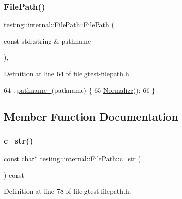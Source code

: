 \subsubsection{\texorpdfstring{File\+Path()}{FilePath()}\hspace{0.1cm}{\footnotesize\ttfamily [3/3]}}
{\footnotesize\ttfamily testing\+::internal\+::\+File\+Path\+::\+File\+Path (\begin{DoxyParamCaption}\item[{const std\+::string \&}]{pathname }\end{DoxyParamCaption})\hspace{0.3cm}{\ttfamily [inline]}, {\ttfamily [explicit]}}



Definition at line 64 of file gtest-\/filepath.\+h.


\begin{DoxyCode}
64                                                : \hyperlink{classtesting_1_1internal_1_1FilePath_a12ce28a0015f85604e0372230fa18d6e}{pathname\_}(pathname) \{
65     \hyperlink{classtesting_1_1internal_1_1FilePath_aa2f6d7d7823f71f25de50d309c966ef7}{Normalize}();
66   \}
\end{DoxyCode}


\subsection{Member Function Documentation}
\mbox{\label{classtesting_1_1internal_1_1FilePath_a43e9ff978b0d7c43c401d976d4621aa3}} 
\subsubsection{\texorpdfstring{c\+\_\+str()}{c\_str()}}
{\footnotesize\ttfamily const char$\ast$ testing\+::internal\+::\+File\+Path\+::c\+\_\+str (\begin{DoxyParamCaption}{ }\end{DoxyParamCaption}) const\hspace{0.3cm}{\ttfamily [inline]}}



Definition at line 78 of file gtest-\/filepath.\+h.



